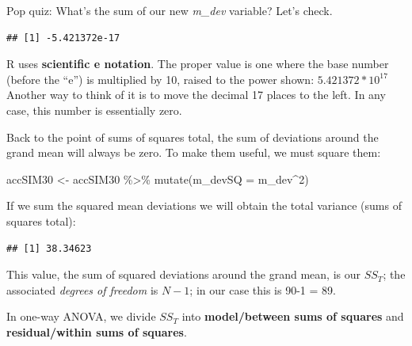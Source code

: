 \documentclass[
  english,
]{book}
\newenvironment{Shaded}{\begin{snugshade}}{\end{snugshade}}
\newcommand{\AttributeTok}[1]{\textcolor[rgb]{0.77,0.63,0.00}{#1}}
\newcommand{\DecValTok}[1]{\textcolor[rgb]{0.00,0.00,0.81}{#1}}
\newcommand{\FunctionTok}[1]{\textcolor[rgb]{0.00,0.00,0.00}{#1}}
\newcommand{\NormalTok}[1]{#1}
\newcommand{\OtherTok}[1]{\textcolor[rgb]{0.56,0.35,0.01}{#1}}
\newcommand{\SpecialCharTok}[1]{\textcolor[rgb]{0.00,0.00,0.00}{#1}}
\begin{document}
Pop quiz: What's the sum of our new \emph{m\_dev} variable? Let's check.

\begin{Shaded}
\end{Shaded}

\begin{verbatim}
## [1] -5.421372e-17
\end{verbatim}

R uses \textbf{scientific e notation}. The proper value is one where the base number (before the ``e'') is multiplied by 10, raised to the power shown: \(5.421372 * 10^{17}\) Another way to think of it is to move the decimal 17 places to the left. In any case, this number is essentially zero.

Back to the point of sums of squares total, the sum of deviations around the grand mean will always be zero. To make them useful, we must square them:

\begin{Shaded}
\begin{Highlighting}[]
\NormalTok{accSIM30 }\OtherTok{\textless{}{-}}\NormalTok{ accSIM30 }\SpecialCharTok{\%\textgreater{}\%} 
  \FunctionTok{mutate}\NormalTok{(}\AttributeTok{m\_devSQ =}\NormalTok{ m\_dev}\SpecialCharTok{\^{}}\DecValTok{2}\NormalTok{)}
\end{Highlighting}
\end{Shaded}

If we sum the squared mean deviations we will obtain the total variance (sums of squares total):

\begin{Shaded}
\end{Shaded}

\begin{verbatim}
## [1] 38.34623
\end{verbatim}

This value, the sum of squared deviations around the grand mean, is our \(SS_T\); the associated \emph{degrees of freedom} is \(N - 1\); in our case this is 90-1 = 89.

In one-way ANOVA, we divide \(SS_T\) into \textbf{model/between sums of squares} and \textbf{residual/within sums of squares}.
\end{document}
